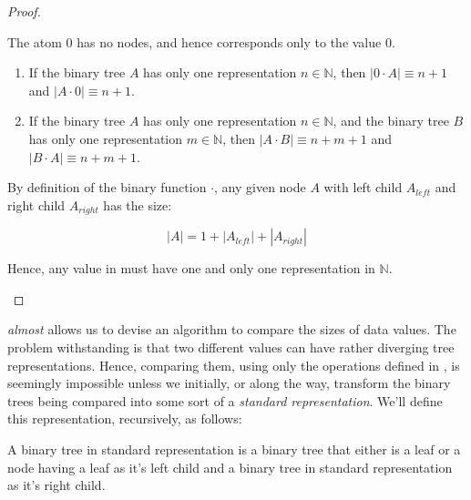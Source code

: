 \begin{proof}\ \\

\begin{description}[\setleftmargin{70pt}\setlabelstyle{\bf}]

\item [Base] The atom $0$ has no nodes, and hence corresponds only to the value
$0$.

\item [Assumption]

\begin{enumerate}

\item If the binary tree $A$ has only one representation $n\in\mathbb{N}$, then
$\left|0\cdot A\right|\equiv n+1$ and $\left|A\cdot 0\right|\equiv n+1$.

\item If the binary tree $A$ has only one representation $n\in\mathbb{N}$, and
the binary tree $B$ has only one representation $m\in\mathbb{N}$, then
$\left|A\cdot B\right|\equiv n+m+1$ and $\left|B\cdot A\right|\equiv n+m+1$.

\end{enumerate}

\item [Induction]

By definition of the binary function $\cdot$, any given node $A$ with left
child $A_{left}$ and right child $A_{right}$ has the size:

$$\left|A\right|=1+\left|A_{left}\right|+\left|A_{right}\right|$$

Hence, any value in \D{} must have one and only one representation in
$\mathbb{N}$.

\end{description}

\end{proof}

 \emph{almost} allows us to devise an algorithm to
compare the sizes of data values. The problem withstanding is that two
different values can have rather diverging tree representations. Hence,
comparing them, using only the operations defined in , is
seemingly impossible unless we initially, or along the way, transform the
binary trees being compared into some sort of a \emph{standard representation}.
We'll define this representation, recursively, as follows:

\begin{definition}\label{definition:standard-representation}

A binary tree in standard representation is a binary tree that either is a leaf
or a node having a leaf as it's left child and a binary tree in standard
representation as it's right child.

\end{definition}

